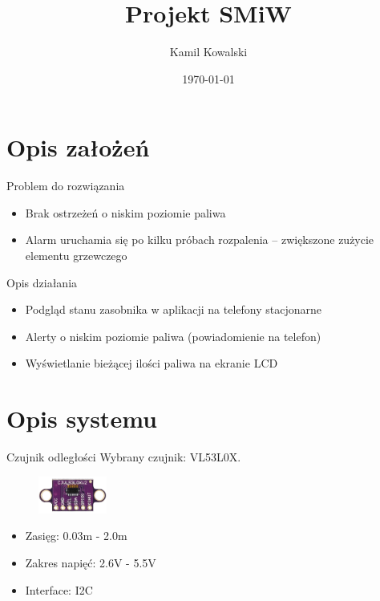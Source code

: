 \documentclass[11pt]{beamer}
\author{Kamil Kowalski}
\title{Projekt SMiW}
\institute[]{Politechnika Śląska\par Wydział Automatyki Elektroniki  i Informatyki}
\date{\today}
\begin{document}
\begin{frame}
\titlepage
\end{frame}

\section{Opis założeń}

\begin{frame}{Problem do rozwiązania}

    \begin{itemize}
        \item Brak ostrzeżeń o niskim poziomie paliwa
        \item Alarm uruchamia się po kilku próbach rozpalenia -- zwiększone zużycie elementu grzewczego
    \end{itemize}

\end{frame}

\begin{frame}{Opis działania}
    
    \begin{itemize}
        \item Podgląd stanu zasobnika w aplikacji na telefony stacjonarne
        \item Alerty o niskim poziomie paliwa (powiadomienie na telefon)
        \item Wyświetlanie bieżącej ilości paliwa na ekranie LCD
    \end{itemize}

\end{frame}

\section{Opis systemu}

\begin{frame}{Czujnik odległości}
 Wybrany czujnik: VL53L0X.
 \begin{figure}
     \includegraphics[width=0.2\textwidth, angle=-90]{images/vl53l0x}
 \end{figure}
 \begin{itemize}
     \item Zasięg: 0.03m - 2.0m
     \item Zakres napięć: 2.6V - 5.5V
     \item Interface: I2C
 \end{itemize}

\end{frame}
\end{document}
